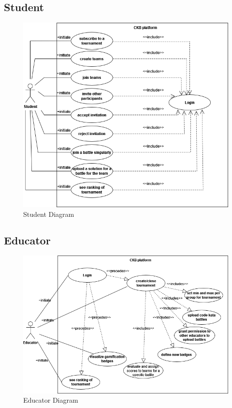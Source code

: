 \subsection{Student}
\begin{figure}[H]
    \begin{center}
        \includegraphics[width=0.8\linewidth]{Images/UCD_Student.png}
        \caption{Student Diagram}
        \label{fig:class_diagram}%
    \end{center}
\end{figure}
\subsection{Educator}
\begin{figure}[H]
    \begin{center}
        \includegraphics[width=0.8\linewidth]{Images/UCD_Educators.png}
        \caption{Educator Diagram}
        \label{fig:class_diagram}%
    \end{center}
\end{figure}

